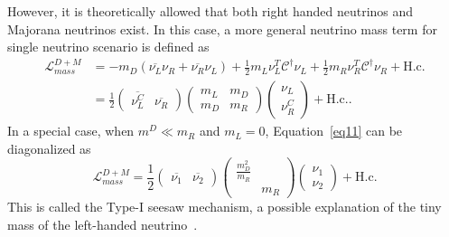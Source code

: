    However, it is theoretically allowed that both right handed neutrinos and Majorana neutrinos exist. 
    In this case, a more general neutrino mass term for single neutrino scenario is defined as 
    \begin{equation}
    \label{eq11}
    \begin{aligned}
    \mathscr{L}_{mass}^{D+M} &= - m_D(\overline{\nu_{L}}\nu_{R} + \overline{\nu_{R}}\nu_{L}) + \frac{1}{2}m_L{\nu_{L}^T} \mathcal{C}^\dagger \nu_{L} + \frac{1}{2}m_R{\nu_{R}^T} \mathcal{C}^\dagger \nu_{R} + \textrm{H.c.} \\
    & = \frac{1}{2}(\begin{array}{cc}
    \overline{\nu^C_L} & \overline{\nu_R} \end{array}) 
    \left(\begin{array}{cc}
    m_L & m_D \\
    m_D & m_R
    \end{array}\right)
    \left(\begin{array}{c}
    \nu_L \\
    \nu_R^C
    \end{array}\right) + \textrm{H.c.}.
    \end{aligned}
    \end{equation}
    In a special case, when $m^D \ll m_R$ and $m_L = 0$, Equation~\ref{eq11} can be diagonalized as
    \begin{equation}
    \label{eq12}
    \mathscr{L}_{mass}^{D+M}  = \frac{1}{2}(\begin{array}{cc}
    \overline{\nu_1} & \overline{\nu_2} \end{array}) 
    \left(\begin{array}{cc}
    \frac{m_D^2}{m_R} &  \\
     & m_R
    \end{array}\right)
    \left(\begin{array}{c}
    \nu_1 \\
    \nu_2
    \end{array}\right) + \textrm{H.c.}
    \end{equation}
    This is called the Type-I seesaw mechanism, a possible explanation of the tiny mass of the left-handed neutrino~\cite{bib:yanagida, bib:Ramond}.

    
